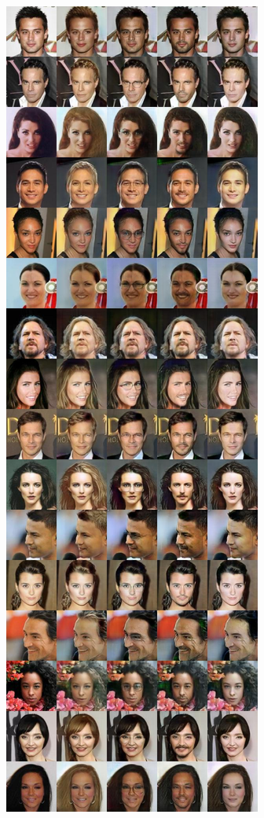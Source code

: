 \begin{figure}
    \centering
    \includegraphics[height=0.85\textheight]{6_demd/figs/mwgan_res/mwgan-00001-images.jpg}

\end{figure}
